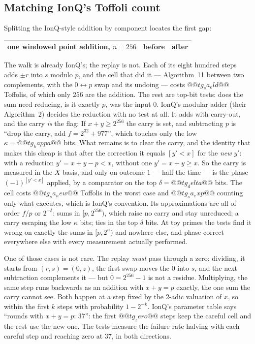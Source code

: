 \subsection{Matching IonQ's Toffoli count}\label{ec:sec:toffgap}

Splitting the IonQ-style addition by component locates the first gap:

\begin{center}\small
\begin{tabular}{lrr}
\toprule
one windowed point addition, $n=256$ & before & after\\
\midrule
\bottomrule
\end{tabular}
\end{center}

The walk is already IonQ's; the replay is not. Each of its eight hundred steps adds $\pm r$ into $s$
modulo $p$, and the cell that did it --- Algorithm~11 between two complements, with the
$0\leftrightarrow p$ swap and its undoing --- costs $@@tg_sa_old@@$ Toffolis, of which only $256$ are
the addition. The rest are top-bit tests: does the sum need reducing, is it exactly $p$, was the
input $0$. IonQ's modular adder (their Algorithm~2) decides the reduction with no test at all. It
adds with carry-out, and the carry \emph{is} the flag:
\noindent If $x+y\ge2^{256}$ the carry is set, and subtracting $p$ is ``drop the carry, add
$f=2^{32}+977$'', which touches only the low $\kappa=@@tg_kappa@@$ bits. What remains is to clear the
carry, and the identity that makes this cheap is that after the correction it equals $[y'<x]$ for
the \emph{new} $y'$: with a reduction $y'=x+y-p<x$, without one $y'=x+y\ge x$. So the carry is
measured in the $X$ basis, and only on outcome $1$ --- half the time --- is the phase $(-1)^{[y'<x]}$
applied, by a comparator on the top $\delta=@@tg_delta@@$ bits. The cell costs $@@tg_sa_new@@$
Toffolis in the worst case and $@@tg_sa_exp@@$ counting only what executes, which is IonQ's
convention. Its approximations are all of order $f/p$ or $2^{-\delta}$: sums in $[p,2^{256})$,
which raise no carry and stay unreduced; a carry escaping the low $\kappa$ bits; ties in the top
$\delta$ bits. At toy primes the tests find it wrong on exactly the sums in $[p,2^n)$ and nowhere
else, and phase-correct everywhere else with every measurement actually performed.

One of those cases is not rare. The replay \emph{must} pass through a zero: dividing, it starts from
$(r,s)=(0,z)$, the first swap moves the $0$ into $s$, and the next subtraction complements it ---
but $\overline0=2^{256}-1$ is not a residue. Multiplying, the same step runs backwards as an addition
with $x+y=p$ exactly, the one sum the carry cannot see. Both happen at a step fixed by the 2-adic
valuation of $x$, so within the first $k$ steps with probability $1-2^{-k}$. IonQ's parameter table
says ``rounds with $x+y=p$: 37'': the first $@@tg_zero@@$ steps keep the careful cell and the rest use
the new one. The tests measure the failure rate halving with each careful step and reaching zero
at $37$, in both directions.


